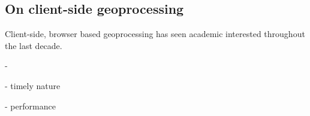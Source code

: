 









\subsection{On client-side geoprocessing}

Client-side, browser based geoprocessing has seen academic interested throughout the last decade. 

- 

- timely nature

- performance 







